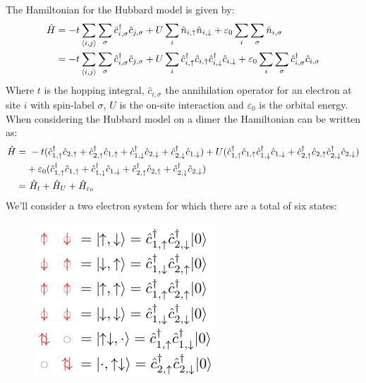 \documentclass[12pt]{article}
\begin{document}
\noindent
The Hamiltonian for the Hubbard model is given by:
\begin{align}
\hat{H}&=-t\sum_{\langle i,j\rangle}\sum_\sigma \hat{c}_{i,\sigma}^\dagger \hat{c}_{j,\sigma} + U\sum_i \hat{n}_{i,\uparrow}\hat{n}_{i,\downarrow}+\varepsilon_0\sum_i\sum_\sigma \hat{n}_{i,\sigma}\\
&= -t\sum_{\langle i,j\rangle}\sum_\sigma \hat{c}_{i,\sigma}^\dagger \hat{c}_{j,\sigma} + U\sum_i \hat{c}_{i,\uparrow}^\dagger \hat{c}_{i,\uparrow}\hat{c}_{i,\downarrow}^\dagger \hat{c}_{i,\downarrow}+\varepsilon_0\sum_i\sum_\sigma \hat{c}_{i,\sigma}^\dagger\hat{c}_{i,\sigma}\notag
\end{align}
Where $t$ is the hopping integral, $\hat{c}_{i,\sigma}$ the annihilation operator for an electron at site $i$ with spin-label $\sigma$, $U$ is the on-site interaction and $\varepsilon_0$ is the orbital energy. When considering the Hubbard model on a dimer the Hamiltonian can be written as:
\begin{align}
\hat{H}=&\ -t(\hat{c}_{1,\uparrow}^\dagger \hat{c}_{2,\uparrow}+\hat{c}_{2,\uparrow}^\dagger \hat{c}_{1,\uparrow}+\hat{c}_{1,\downarrow}^\dagger \hat{c}_{2,\downarrow}+\hat{c}_{2,\downarrow}^\dagger \hat{c}_{1,\downarrow}) + U(\hat{c}_{1,\uparrow}^\dagger \hat{c}_{1,\uparrow}\hat{c}_{1,\downarrow}^\dagger \hat{c}_{1,\downarrow}+\hat{c}_{2,\uparrow}^\dagger \hat{c}_{2,\uparrow}\hat{c}_{2,\downarrow}^\dagger \hat{c}_{2,\downarrow})\\
&+ \varepsilon_0(\hat{c}_{1,\uparrow}^\dagger\hat{c}_{1,\uparrow}+\hat{c}_{1,\downarrow}^\dagger\hat{c}_{1,\downarrow}+\hat{c}_{2,\uparrow}^\dagger\hat{c}_{2,\uparrow}+\hat{c}_{2,\downarrow}^\dagger\hat{c}_{2,\downarrow})\notag\\
=&\ \hat{H}_t+\hat{H}_U+\hat{H}_{\varepsilon_0}
\end{align}
We'll consider a two electron system for which there are a total of six states:
\begin{figure}[h!]
\centering
\includegraphics[scale=1]{2electronStates.pdf}
\end{figure}\\
\end{document}
